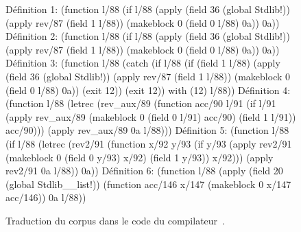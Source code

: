 \begin{figure}
\begin{lisp}
Définition 1: (function l/88 (if l/88
    (apply (field 36 (global Stdlib!)) (apply rev/87 (field 1 l/88))
      (makeblock 0 (field 0 l/88) 0a)) 0a))
Définition 2: (function l/88 (if l/88
    (apply (field 36 (global Stdlib!)) (apply rev/87 (field 1 l/88))
      (makeblock 0 (field 0 l/88) 0a)) 0a))
Définition 3: (function l/88 (catch
    (if l/88
      (if (field 1 l/88)
        (apply (field 36 (global Stdlib!)) (apply rev/87 (field 1 l/88))
          (makeblock 0 (field 0 l/88) 0a))
        (exit 12))
      (exit 12)) with (12) l/88))
Définition 4: (function l/88 (letrec (rev_aux/89
       (function acc/90 l/91
         (if l/91
           (apply rev_aux/89 (makeblock 0 (field 0 l/91) acc/90)
             (field 1 l/91))
           acc/90))) (apply rev_aux/89 0a l/88)))
Définition 5: (function l/88 (if l/88
    (letrec (rev2/91
         (function x/92 y/93
           (if y/93
             (apply rev2/91 (makeblock 0 (field 0 y/93) x/92) (field 1 y/93))
             x/92)))
      (apply rev2/91 0a l/88)) 0a))
Définition 6: (function l/88 (apply (field 20 (global Stdlib__list!))
    (function acc/146 x/147 (makeblock 0 x/147 acc/146)) 0a l/88))
\end{lisp}
\caption{Traduction du corpus dans le code {\LambdaCode} du compilateur~\OCaml.}
\label{fig:lambda-corpus}
\end{figure}

